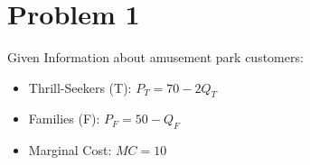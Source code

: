 \documentclass[12pt]{article}
\title{
  \fbox{
    \parbox{0.95\textwidth}{
      \centering
      \Large DBA5101 Analytics in Managerial Economics \\Homework 2\\[1em]
      \normalsize Ying WANG
    }
  }
}
\author{}
\date{}
\begin{document}
\maketitle
\thispagestyle{fancy}

\vspace{-4em} %

\section*{Problem 1}
Given Information about amusement park customers:
\begin{itemize}
    \item Thrill-Seekers (T): $P_T = 70 - 2Q_T$
    \item Families (F): $P_F = 50 - Q_F$
    \item Marginal Cost: $MC = 10$
\end{itemize}
\end{document}
